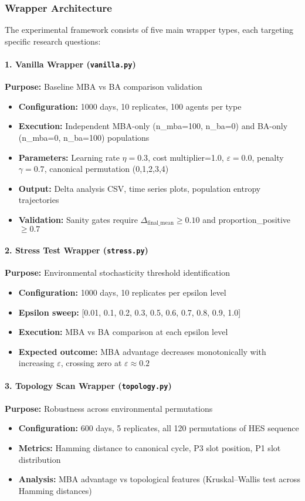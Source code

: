 \documentclass[aps,pre,twocolumn,floatfix,nofootinbib,amsmath,amssymb]{revtex4-2}
\begin{document}
\subsubsection{Wrapper Architecture}

The experimental framework consists of five main wrapper types, each targeting specific research questions:

\paragraph{1. Vanilla Wrapper (\texttt{vanilla.py})}
\textbf{Purpose:} Baseline MBA vs BA comparison validation
\begin{itemize}
\item \textbf{Configuration:} 1000 days, 10 replicates, 100 agents per type
\item \textbf{Execution:} Independent MBA-only (n\_mba=100, n\_ba=0) and BA-only (n\_mba=0, n\_ba=100) populations
\item \textbf{Parameters:} Learning rate $\eta=0.3$, cost multiplier=1.0, $\varepsilon=0.0$, penalty $\gamma=0.7$, canonical permutation (0,1,2,3,4)
\item \textbf{Output:} Delta analysis CSV, time series plots, population entropy trajectories
\item \textbf{Validation:} Sanity gates require $\Delta_{\text{final\_mean}} \geq 0.10$ and proportion\_positive $\geq 0.7$
\end{itemize}

\paragraph{2. Stress Test Wrapper (\texttt{stress.py})}
\textbf{Purpose:} Environmental stochasticity threshold identification
\begin{itemize}
\item \textbf{Configuration:} 1000 days, 10 replicates per epsilon level
\item \textbf{Epsilon sweep:} [0.01, 0.1, 0.2, 0.3, 0.5, 0.6, 0.7, 0.8, 0.9, 1.0]
\item \textbf{Execution:} MBA vs BA comparison at each epsilon level
\item \textbf{Expected outcome:} MBA advantage decreases monotonically with increasing $\varepsilon$, crossing zero at $\varepsilon \approx 0.2$
\end{itemize}

\paragraph{3. Topology Scan Wrapper (\texttt{topology.py})}
\textbf{Purpose:} Robustness across environmental permutations
\begin{itemize}
\item \textbf{Configuration:} 600 days, 5 replicates, all 120 permutations of HES sequence
\item \textbf{Metrics:} Hamming distance to canonical cycle, P3 slot position, P1 slot distribution
\item \textbf{Analysis:} MBA advantage vs topological features (Kruskal--Wallis test across Hamming distances)
\end{itemize}
\end{document}
